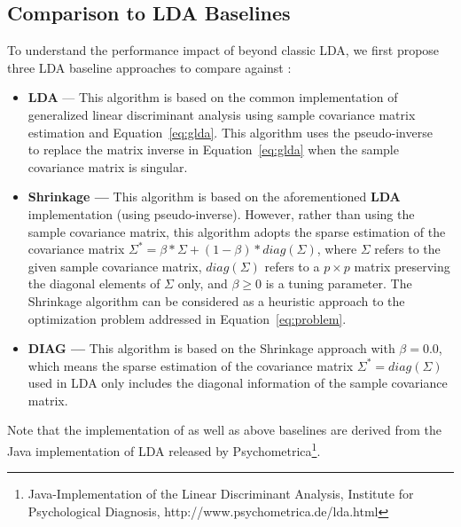\subsection{Comparison to LDA Baselines}\label{sec:baselines}
To understand the performance impact of \TheName{} beyond classic LDA, we first propose three LDA baseline approaches to compare against \TheName{}:
\begin{itemize}
    
    \item \textbf{LDA} --- This algorithm is based on the common implementation of generalized linear discriminant analysis using sample covariance matrix estimation and Equation~\ref{eq:glda}.
This algorithm uses the pseudo-inverse~\cite{ye2004optimization} to replace the matrix inverse in Equation~\ref{eq:glda} when the sample covariance matrix is singular.
 

\item \textbf{Shrinkage --- } This algorithm is based on the aforementioned \textbf{LDA} implementation (using pseudo-inverse).
However, rather than using the sample covariance matrix, this algorithm adopts the sparse estimation of the covariance matrix $\Sigma^*=\beta*\Sigma+(1-\beta) * diag(\Sigma)$, where $\Sigma$ refers to the given sample covariance matrix, $diag(\Sigma)$ refers to a $p\times p$ matrix preserving the diagonal elements of $\Sigma$ only, and $\beta\geq 0$ is a tuning parameter.
     The Shrinkage algorithm can be considered as a heuristic approach to the optimization problem addressed in Equation~\ref{eq:problem}.


\item \textbf{DIAG --- } This algorithm is based on the Shrinkage approach with $\beta=0.0$, which means the sparse estimation of the covariance matrix $\Sigma^*=diag(\Sigma)$ used in LDA only includes the diagonal information of the sample covariance matrix.

\end{itemize}
Note that the implementation of \TheName{} as well as above baselines are derived from the Java implementation of LDA released by Psychometrica\footnote{Java-Implementation of the Linear Discriminant Analysis, Institute for Psychological Diagnosis, http://www.psychometrica.de/lda.html}.

